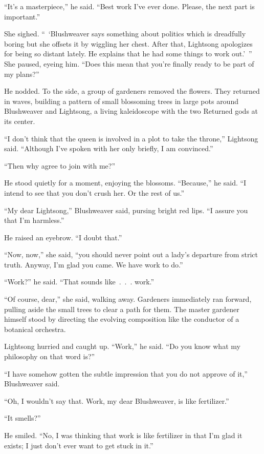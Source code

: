 “It’s a masterpiece,” he said. “Best work I’ve ever done. Please, the next part is important.”

She sighed. “~‘Blushweaver says something about politics which is dreadfully boring but she offsets it by wiggling her chest. After that, Lightsong apologizes for being so distant lately. He explains that he had some things to work out.’~” She paused, eyeing him. “Does this mean that you’re finally ready to be part of my plans?”

He nodded. To the side, a group of gardeners removed the flowers. They returned in waves, building a pattern of small blossoming trees in large pots around Blushweaver and Lightsong, a living kaleidoscope with the two Returned gods at its center.

“I don’t think that the queen is involved in a plot to take the throne,” Lightsong said. “Although I’ve spoken with her only briefly, I am convinced.”

“Then why agree to join with me?”

He stood quietly for a moment, enjoying the blossoms. “Because,” he said. “I intend to see that you don’t crush her. Or the rest of us.”

“My dear Lightsong,” Blushweaver said, pursing bright red lips. “I assure you that I’m harmless.”

He raised an eyebrow. “I doubt that.”

“Now, now,” she said, “you should never point out a lady’s departure from strict truth. Anyway, I’m glad you came. We have work to do.”

“Work?” he said. “That sounds like~.~.~. work.”

“Of course, dear,” she said, walking away. Gardeners immediately ran forward, pulling aside the small trees to clear a path for them. The master gardener himself stood by directing the evolving composition like the conductor of a botanical orchestra.

Lightsong hurried and caught up. “Work,” he said. “Do you know what my philosophy on that word is?”

“I have somehow gotten the subtle impression that you do not approve of it,” Blushweaver said.

“Oh, I wouldn’t say that. Work, my dear Blushweaver, is like fertilizer.”

“It smells?”

He smiled. “No, I was thinking that work is like fertilizer in that I’m glad it exists; I just don’t ever want to get stuck in it.”

